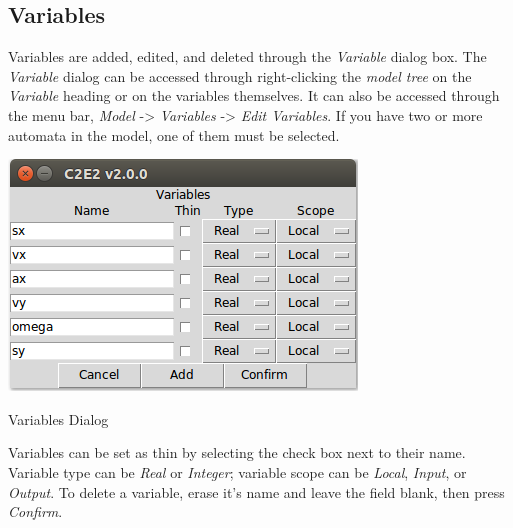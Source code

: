\documentclass{tufte-book} %
\begin{document}
\subsection{Variables}
Variables are added, edited, and deleted through the \emph{Variable} dialog box. The \emph{Variable} dialog can be accessed through right-clicking the \emph{model tree} on the \emph{Variable} heading or on the variables themselves. It can also be accessed through the menu bar, \emph{Model} -> \emph{Variables} -> \emph{Edit Variables}. If you have two or more automata in the model, one of them must be selected. 
\begin{marginfigure}
 \centerline{\includegraphics[scale=.25,keepaspectratio=true]{ManualImages/C2E2_version2.0/variables-dialog.png}}
 \caption{Variables Dialog} 
  \label{figure:variables_dialog}
\end{marginfigure}
Variables can be set as thin by selecting the check box next to their name. Variable type can be \emph{Real} or \emph{Integer}; variable scope can be \emph{Local}, \emph{Input}, or \emph{Output}.
To delete a variable, erase it's name and leave the field blank, then press \emph{Confirm}.
\end{document}
